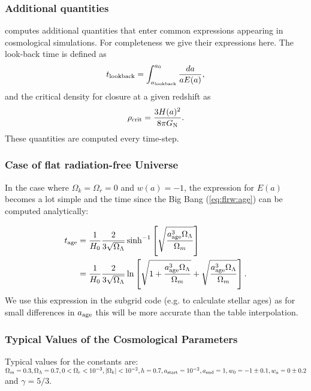 \subsubsection{Additional quantities}

\swift computes additional quantities that enter common expressions appearing in
cosmological simulations. For completeness we give their expressions here. The
look-back time is defined as
\begin{equation}
  t_{\rm lookback} = \int_{a_{\rm lookback}}^{a_0} \frac{da}{a E(a)},
\end{equation}
and the critical density for closure at a given redshift as
\begin{equation}
  \rho_{\rm crit} = \frac{3H(a)^2}{8\pi G_{\rm{N}}}.
\end{equation}
These quantities are computed every time-step.

\subsubsection{Case of flat radiation-free Universe}

In the case where $\Omega_k = \Omega_r = 0$ and $w(a) = -1$, the
expression for $E(a)$ becomes a lot simple and the time since the Big
Bang (\ref{eq:flrw:age}) can be computed analytically:

\begin{align}
  t_{\rm age} &= \frac{1}{H_0}\frac{2}{3\sqrt{\Omega_\Lambda}} \sinh^{-1}\left[\sqrt{\frac{a_{\rm age}^3 \Omega_\Lambda}{\Omega_m}}\right] \\
              &= \frac{1}{H_0}\frac{2}{3\sqrt{\Omega_\Lambda}}
\ln\left[\sqrt{1+\frac{a_{\rm age}^3 \Omega_\Lambda}{\Omega_m}} + \sqrt{\frac{a_{\rm age}^3 \Omega_\Lambda}{\Omega_m}}\right].
\end{align}
We use this expression in the subgrid code (e.g. to calculate stellar
ages) as for small differences in $a_{\rm age}$ this will be more
accurate than the table interpolation.

\subsubsection{Typical Values of the Cosmological Parameters}

Typical values for the constants are: $\Omega_m = 0.3, \Omega_\Lambda=0.7, 0 <
\Omega_r<10^{-3}, |\Omega_k | < 10^{-2}, h=0.7, a_{\rm start} = 10^{-2}, a_{\rm
end} = 1, w_0 = -1\pm 0.1, w_a=0\pm0.2$ and $\gamma = 5/3$.
